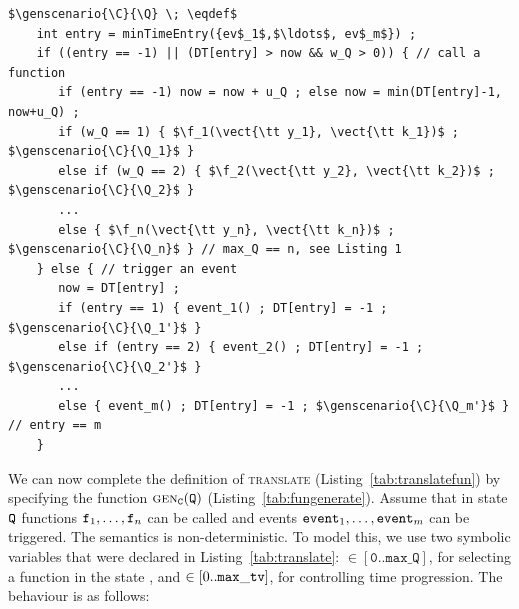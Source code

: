{\small
\begin{lstlisting}[frame=none,numbers=none,language={[JML]Java},mathescape=true,caption={The function $\genscenario{\C}{\Q}$; 
the ${\f}_1, \ldots, {\f}_n$ and ${\tt event\_1}, \ldots, {\tt event\_m}$ are the functions and events that start in {\Q} and end in $\Q_1, \ldots, \Q_n$ and 
$\Q_1', \ldots , \Q_m'$, respectively.},label={tab:fungenerate},float]
$\genscenario{\C}{\Q} \; \eqdef$ 
    int entry = minTimeEntry({ev$_1$,$\ldots$, ev$_m$}) ; 
    if ((entry == -1) || (DT[entry] > now && w_Q > 0)) { // call a function 
       if (entry == -1) now = now + u_Q ; else now = min(DT[entry]-1, now+u_Q) ;
       if (w_Q == 1) { $\f_1(\vect{\tt y_1}, \vect{\tt k_1})$ ; $\genscenario{\C}{\Q_1}$ }
       else if (w_Q == 2) { $\f_2(\vect{\tt y_2}, \vect{\tt k_2})$ ; $\genscenario{\C}{\Q_2}$ }
       ...
       else { $\f_n(\vect{\tt y_n}, \vect{\tt k_n})$ ; $\genscenario{\C}{\Q_n}$ } // max_Q == n, see Listing 1
    } else { // trigger an event
       now = DT[entry] ;
       if (entry == 1) { event_1() ; DT[entry] = -1 ; $\genscenario{\C}{\Q_1'}$ }
       else if (entry == 2) { event_2() ; DT[entry] = -1 ; $\genscenario{\C}{\Q_2'}$ }
       ...
       else { event_m() ; DT[entry] = -1 ; $\genscenario{\C}{\Q_m'}$ } // entry == m
    } 
\end{lstlisting}
}

  We can now complete the definition of \textsc{translate}
  (Listing~\ref{tab:translatefun}) by specifying the function
  $\mbox{\sc gen}_{\tt C}({\tt Q})$ (Listing~\ref{tab:fungenerate}). Assume that
  in state ${\tt Q}$ functions ${\texttt{f}}_1, \ldots, {\texttt{f}}_n$ can be called and
  events ${\tt event}_1, \ldots, {\tt event}_m$ can be triggered. The
  {\Stipula} semantics is non-deterministic. To model this, we use two
  symbolic variables that were declared in
  Listing~\ref{tab:translate}:  $\in [\texttt{0}..\texttt{max\_Q}]$, for selecting a
  function in the state {\Q}, and  $\in [0..{\tt max\_tv}]$, for controlling time
  progression.  The behaviour is as follows:

